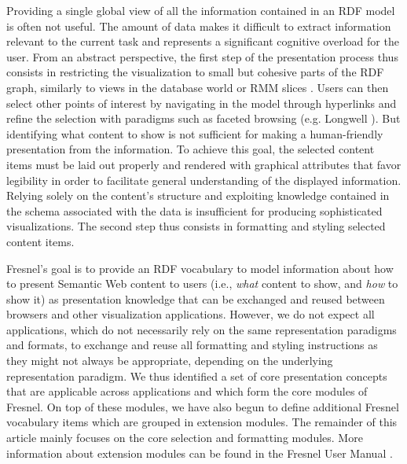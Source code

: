 Providing a single global view of all the information contained in an RDF model is often not useful. The amount of data makes it difficult to extract information relevant to the current task and represents a significant cognitive overload for the user. From an abstract perspective, the first step of the presentation process thus consists in restricting the visualization to small but cohesive parts of the RDF graph, similarly to views in the database world or RMM slices \cite{Isakowitz:1995:RMS}. Users can then select other points of interest by navigating in the model through hyperlinks and refine the selection with paradigms such as faceted browsing (e.g. Longwell \cite{simile}). But identifying what content to show is not sufficient for making a human-friendly presentation from the information. To achieve this goal, the selected content items must be laid out properly and rendered with graphical attributes that favor legibility in order to facilitate general understanding of the displayed information. Relying solely on the content's structure and exploiting knowledge contained in the schema associated with the data is insufficient for producing sophisticated visualizations. The second step thus consists in formatting and styling selected content items.

Fresnel's goal is to provide an RDF vocabulary to model information about how to present Semantic Web content to users (i.e., {\em what } content to show, and {\em how} to show it) as presentation knowledge that can be exchanged and reused between browsers and other visualization applications. However, we do not expect all applications, which do not necessarily rely on the same representation paradigms and formats, to exchange and reuse all formatting and styling instructions as they might not always be appropriate, depending on the underlying representation paradigm. We thus identified a set of core presentation concepts that are applicable across applications and which form the core modules of Fresnel. On top of these modules, we have also begun to define additional Fresnel vocabulary items which are grouped in extension modules. The remainder of this article mainly focuses on the core selection and formatting modules. More information about extension modules can be found in the Fresnel User Manual \cite{fresnel05}.

